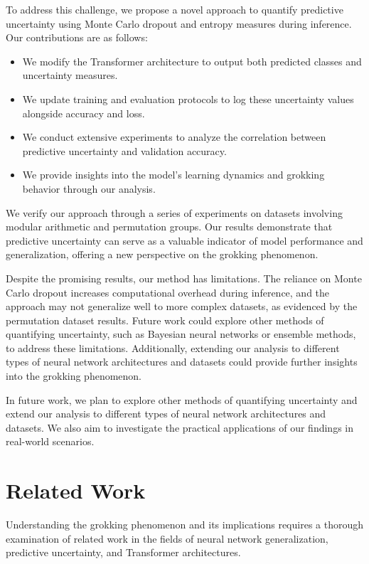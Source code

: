 \documentclass{article} %
\begin{document}
To address this challenge, we propose a novel approach to quantify predictive uncertainty using Monte Carlo dropout and entropy measures during inference. Our contributions are as follows:
\begin{itemize}
    \item We modify the Transformer architecture to output both predicted classes and uncertainty measures.
    \item We update training and evaluation protocols to log these uncertainty values alongside accuracy and loss.
    \item We conduct extensive experiments to analyze the correlation between predictive uncertainty and validation accuracy.
    \item We provide insights into the model's learning dynamics and grokking behavior through our analysis.
\end{itemize}

We verify our approach through a series of experiments on datasets involving modular arithmetic and permutation groups. Our results demonstrate that predictive uncertainty can serve as a valuable indicator of model performance and generalization, offering a new perspective on the grokking phenomenon.

Despite the promising results, our method has limitations. The reliance on Monte Carlo dropout increases computational overhead during inference, and the approach may not generalize well to more complex datasets, as evidenced by the permutation dataset results. Future work could explore other methods of quantifying uncertainty, such as Bayesian neural networks or ensemble methods, to address these limitations. Additionally, extending our analysis to different types of neural network architectures and datasets could provide further insights into the grokking phenomenon.

In future work, we plan to explore other methods of quantifying uncertainty and extend our analysis to different types of neural network architectures and datasets. We also aim to investigate the practical applications of our findings in real-world scenarios.

\section{Related Work}
\label{sec:related}

Understanding the grokking phenomenon and its implications requires a thorough examination of related work in the fields of neural network generalization, predictive uncertainty, and Transformer architectures.
\end{document}

